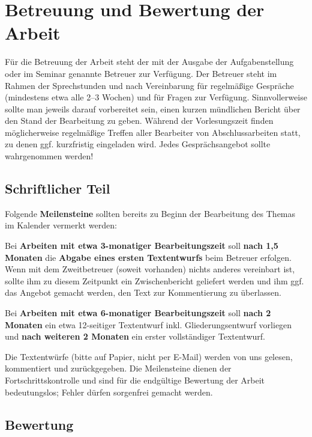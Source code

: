 \documentclass[
    fontsize=12pt,
    headings=small,
    parskip=half,           %
    bibliography=totoc,
    numbers=noenddot,       %
    open=any,               %
    ]{scrreprt}
\begin{document}
\chapter{Betreuung und Bewertung der Arbeit}

Für die Betreuung der Arbeit steht der mit der Ausgabe der Aufgabenstellung oder im Seminar genannte Betreuer zur Verfügung. Der Betreuer steht im Rahmen der Sprechstunden und nach Vereinbarung für regelmäßige Gespräche (mindestens etwa alle 2--3 Wochen) und für Fragen zur Verfügung. Sinnvollerweise sollte man jeweils darauf vorbereitet sein, einen kurzen mündlichen Bericht über den Stand der Bearbeitung zu geben. Während der Vorlesungszeit finden möglicherweise regelmäßige Treffen aller Bearbeiter von Abschlussarbeiten statt, zu denen ggf. kurzfristig eingeladen wird. Jedes Gesprächsangebot sollte wahrgenommen werden!

\section{Schriftlicher Teil}

Folgende \textbf{Meilensteine} sollten bereits zu Beginn der Bearbeitung des Themas im Kalender vermerkt werden:

Bei \textbf{Arbeiten mit etwa 3-monatiger Bearbeitungszeit} soll \textbf{nach 1,5 Monaten} die \textbf{Abgabe eines ersten Textentwurfs} beim Betreuer erfolgen. Wenn mit dem Zweitbetreuer (soweit vorhanden) nichts anderes vereinbart ist, sollte ihm zu diesem Zeitpunkt ein Zwischenbericht geliefert werden und ihm ggf. das Angebot gemacht werden, den Text zur Kommentierung zu überlassen.

Bei \textbf{Arbeiten mit etwa 6-monatiger Bearbeitungszeit} soll \textbf{nach 2 Monaten} ein etwa 12-seitiger Textentwurf inkl. Gliederungsentwurf vorliegen und \textbf{nach weiteren 2 Monaten} ein erster vollständiger Textentwurf.

Die Textentwürfe (bitte auf Papier, nicht per E-Mail) werden von uns gelesen, kommentiert und zurückgegeben. Die Meilensteine dienen der Fortschrittskontrolle und sind für die endgültige Bewertung der Arbeit bedeutungslos; Fehler dürfen sorgenfrei gemacht werden.

\section{Bewertung}
\end{document}
